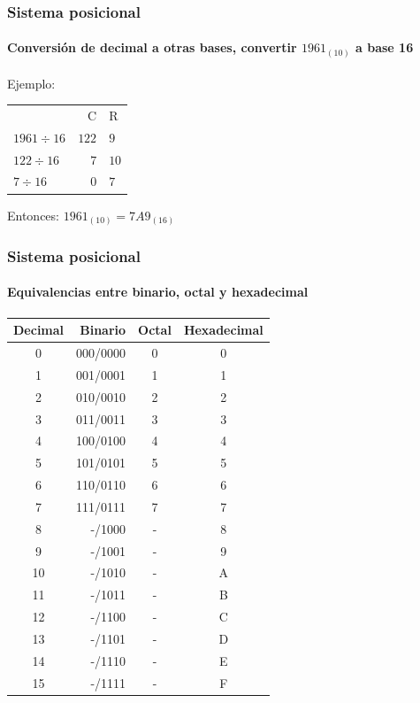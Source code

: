 \documentclass[11pt,a4paper,spanish]{beamer}
\begin{document}
\begin{frame}

\frametitle{Sistema posicional}
    \framesubtitle{Conversión de decimal a otras bases, convertir
    $1961_{(10)}$ a base 16}

    Ejemplo:
    \pause

    \begin{tabular}[t]{ l r l}

        & C & R\\

        $1961{\div}16$ & $122$ & $9$\\\pause

        $122{\div}16$ & $7$ & $10$\\\pause

        $7{\div}16$ & $0$ & $7$\\

    \end{tabular}

\pause
Entonces:
    $1961_{(10)} = 7A9_{(16)}$

\end{frame}

\begin{frame}

\frametitle{Sistema posicional}
\framesubtitle{Equivalencias entre binario, octal y hexadecimal}
\small\centering
\begin{tabular}{ | c | r | c | c | }
    \hline
    Decimal & {\centering Binario} & Octal & Hexadecimal \\
    \hline
    \hline
    0 & 000/0000 & 0 & 0 \\
    \hline
    1 & 001/0001 & 1 & 1 \\
    \hline
    2 & 010/0010 & 2 & 2 \\
    \hline
    3 & 011/0011 & 3 & 3 \\
    \hline
    4 & 100/0100 & 4 & 4 \\
    \hline
    5 & 101/0101 & 5 & 5 \\
    \hline
    6 & 110/0110 & 6 & 6\\
    \hline
    7 & 111/0111 & 7 & 7 \\
    \hline
    8 & -/1000 & - & 8 \\
    \hline
    9 & -/1001 & - & 9 \\
    \hline
    10 & -/1010 & - & A \\
    \hline
    11 & -/1011 & - & B \\
    \hline
    12 & -/1100 & - & C \\
    \hline
    13 & -/1101 & - & D \\
    \hline
    14 & -/1110 & - & E \\
    \hline
    15 & -/1111 & - & F \\
    \hline
\end{tabular}

\end{frame}
\end{document}
